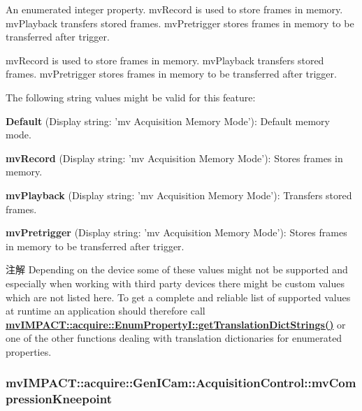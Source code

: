 An enumerated integer property. mv\+Record is used to store frames in memory. mv\+Playback transfers stored frames. mv\+Pretrigger stores frames in memory to be transferred after trigger. 

mv\+Record is used to store frames in memory. mv\+Playback transfers stored frames. mv\+Pretrigger stores frames in memory to be transferred after trigger.

The following string values might be valid for this feature\+:
\begin{DoxyItemize}
\item {\bfseries Default} (Display string\+: 'mv Acquisition Memory Mode')\+: Default memory mode.
\item {\bfseries mv\+Record} (Display string\+: 'mv Acquisition Memory Mode')\+: Stores frames in memory.
\item {\bfseries mv\+Playback} (Display string\+: 'mv Acquisition Memory Mode')\+: Transfers stored frames.
\item {\bfseries mv\+Pretrigger} (Display string\+: 'mv Acquisition Memory Mode')\+: Stores frames in memory to be transferred after trigger.
\end{DoxyItemize}

\begin{DoxyNote}{注解}
Depending on the device some of these values might not be supported and especially when working with third party devices there might be custom values which are not listed here. To get a complete and reliable list of supported values at runtime an application should therefore call {\bfseries \hyperlink{classmv_i_m_p_a_c_t_1_1acquire_1_1_enum_property_i_a0ba6ccbf5ee69784d5d0b537924d26b6}{mv\+I\+M\+P\+A\+C\+T\+::acquire\+::\+Enum\+Property\+I\+::get\+Translation\+Dict\+Strings()}} or one of the other functions dealing with translation dictionaries for enumerated properties. 
\end{DoxyNote}
\hypertarget{classmv_i_m_p_a_c_t_1_1acquire_1_1_gen_i_cam_1_1_acquisition_control_a288bcc77a513f89597531c170e1c88b6}{
\subsubsection[{mv\+Compression\+Kneepoint}]{ mv\+I\+M\+P\+A\+C\+T\+::acquire\+::\+Gen\+I\+Cam\+::\+Acquisition\+Control\+::mv\+Compression\+Kneepoint}}\label{classmv_i_m_p_a_c_t_1_1acquire_1_1_gen_i_cam_1_1_acquisition_control_a288bcc77a513f89597531c170e1c88b6}


